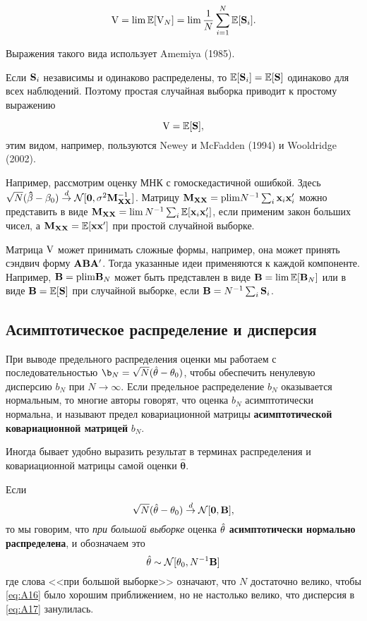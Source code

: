 \[
\mathbf{\mathrm{V}} = \lim \mathbb{E}[\mathbf{\mathrm{V}}_N] = \lim \frac{1}{N} \sum_{i=1}^{N} \mathbb{E}[\mathbf{S}_i].
\]

Выражения такого вида использует Amemiya (1985).

Если $\mathbf{S}_i$ независимы и одинаково распределены, то $\mathbb{E}[\mathbf{S}_i]=\mathbb{E}[\mathbf{S}]$ одинаково для всех наблюдений. Поэтому простая случайная выборка приводит к простому выражению 

\[
\mathbf{\mathrm{V}} = \mathbb{E}[\mathbf{S}],
\]
этим видом, например, пользуются Newey и McFadden (1994) и Wooldridge (2002).

Например, рассмотрим оценку МНК с гомоскедастичной ошибкой. Здесь $\sqrt{N}(\mathbf{\hat{\beta}}-\mathbf{\beta}_0) \overset{d}{\to} \mathcal{N} [\mathbf{0},\sigma^2 \mathbf{M}^{-1}_{\mathbf{XX}}]$. Матрицу $\mathbf{M}_{\mathbf{XX}}=\mathrm{plim } N^{-1} \sum_i \mathbf{x}_i\mathbf{x}_i'$ можно представить в виде $\mathbf{M}_{\mathbf{XX}} = \lim N^{-1} \sum_i \mathbb{E}[\mathbf{x}_i\mathbf{x}_i']$, если применим закон больших чисел, а $\mathbf{M}_{\mathbf{XX}}=\mathbb{E}[\mathbf{x}\mathbf{x}']$ при простой случайной выборке.

Матрица $\mathbf{\mathrm{V}}$ может принимать сложные формы, например, она может принять сэндвич форму $\mathbf{A}\mathbf{B}\mathbf{A}'$. Тогда указанные идеи применяются к каждой компоненте. Например, $\mathbf{B} = \mathrm{plim } \mathbf{B}_N$ может быть представлен в виде $\mathbf{B} = \lim \mathbb{E}[\mathbf{B}_N]$ или в виде $\mathbf{B}=\mathbb{E}[\mathbf{S}]$ при случайной выборке, если $\mathbf{B}=N^{-1}\sum_i \mathbf{S}_i$.

\subsection{Асимптотическое распределение и дисперсия}

При выводе предельного распределения оценки мы работаем с последовательностью $\b_N=\sqrt{N}(\hat{\theta}-\theta_0)$, чтобы обеспечить ненулевую дисперсию $b_N$ при $N\to\infty$. Если предельное распределение $b_N$ оказывается нормальным, то многие авторы говорят, что оценка $b_N$ асимптотически нормальна, и называют предел ковариационной матрицы \textbf{асимптотической ковариационной матрицей} $b_N$.

Иногда бывает удобно выразить результат в терминах распределения и ковариационной матрицы самой оценки $\hat{\mathbf{\theta}}$.

\begin{definition}
\label{def:A18}
Если 
\begin{equation}
\label{eq:A16}
\sqrt{N}(\hat{\mathbf{\theta}}-\mathbf{\theta}_0)\overset{d}{\to} \mathcal{N}[\mathbf{0},\mathbf{B}],	
\end{equation}
то мы говорим, что \textit{при большой выборке} оценка $\hat{\mathbf{\theta}}$ \textbf{асимптотически нормально распределена}, и обозначаем это
\begin{equation}
\label{eq:A17}
	\hat{\mathbf{\theta}} \sim \mathcal{N} [\mathbf{\theta}_0,N^{-1}\mathbf{B}]
\end{equation}
где слова <<при большой выборке>> означают, что $N$ достаточно велико, чтобы \ref{eq:A16} было хорошим приближением, но не настолько велико, что дисперсия в \ref{eq:A17} занулилась.
\end{definition}

